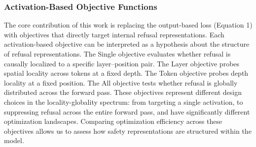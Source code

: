 \documentclass[letterpaper]{article} %
\begin{document}
\subsubsection{Activation-Based Objective Functions}

The core contribution of this work is replacing the output-based loss (Equation 1) with objectives that directly target internal refusal representations. Each activation-based objective can be interpreted as a hypothesis about the structure of refusal representations. The Single objective evaluates whether refusal is causally localized to a specific layer–position pair. The Layer objective probes spatial locality across tokens at a fixed depth. The Token objective probes depth locality at a fixed position. The All objective tests whether refusal is globally distributed across the forward pass. These objectives represent different design choices in the locality-globality spectrum: from targeting a single activation, to suppressing refusal across the entire forward pass, and have significantly different optimization landscapes. Comparing optimization efficiency across these objectives allows us to assess how safety representations are structured within the model.
\end{document}

